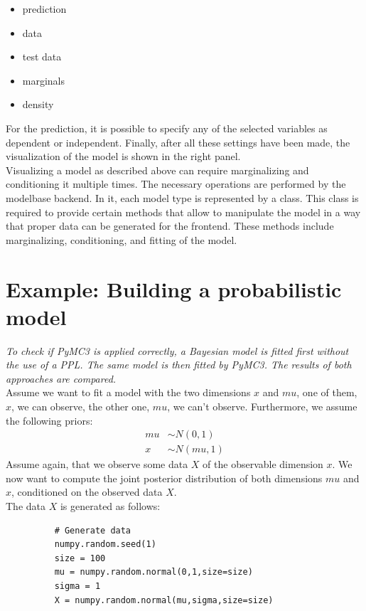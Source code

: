 \documentclass{article}
\begin{document}
\begin{itemize}
	\item prediction
	\item data
	\item test data
	\item marginals
	\item density
\end{itemize}
For the prediction, it is possible to specify any of the selected variables as dependent or independent. Finally, after all these settings have been made, the visualization of the model is shown in the right panel.
\\
Visualizing a model as described above can require marginalizing and conditioning it multiple times. The necessary operations are performed by the modelbase backend.
In it, each model type is represented by a class. This class is required to provide certain methods that allow to manipulate the model in a way that proper data can be generated for the frontend. These methods include marginalizing, conditioning, and fitting of the model.



\section{Example: Building a probabilistic model}
\label{sec:Comparison}
\textit{To check if PyMC3 is applied correctly, a Bayesian model is fitted first without the use of a PPL. The same model is then fitted by PyMC3. The results of both approaches are compared.}
\\
Assume we want to fit a model with the two dimensions $x$ and $mu$, one of them, $x$, we can observe, the other one, $mu$, we can't observe. Furthermore, we assume the following priors:
\begin{equation}
\begin{split}
mu &\sim N(0,1)\\
x &\sim N(mu,1)
\end{split}
\end{equation}
Assume again, that we observe some data $X$ of the observable dimension $x$.
We now want to compute the joint posterior distribution of both dimensions $mu$ and $x$, conditioned on the observed data $X$.
\\
The data $X$ is generated as follows:\\
\begin{figure}[h]
	\begin{lstlisting}
	# Generate data
	numpy.random.seed(1)
	size = 100
	mu = numpy.random.normal(0,1,size=size)
	sigma = 1
	X = numpy.random.normal(mu,sigma,size=size)
	
	\end{lstlisting}
	\label{fig:groundtruth_example_code_data_generation}
\end{figure}
\end{document}
